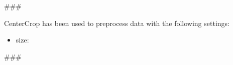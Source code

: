 
\usepackage{comment}


###

CenterCrop has been used to preprocess data with the following settings:
\begin{itemize}
    \item size:
\end{itemize}
\hfill\break
\hfill\break
{}

###



\begin{comment}
Author = DIEGO MICCOLI
Alias = Kozen88
Organization = SWAP Research Group UniBa
Date = 27-12-2023

This mini template is not working by itself because there are latex command missing needed
to compile the file and give as output a pdf file, in addition it has been added jinja
statement in order to control the rendering of the latex file with the jinja library, for these
reasons it needs to be used with the other mini chunks in conjunction.
\end{comment}